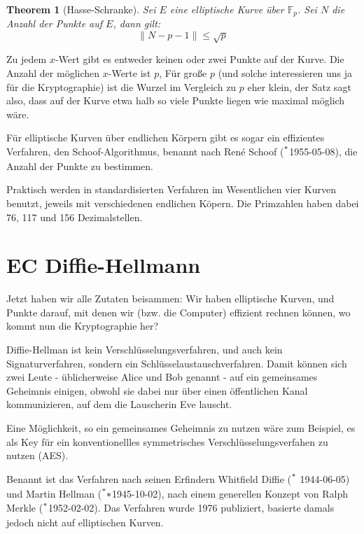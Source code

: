 \documentclass{article}
\newcommand{\F}{\mathbb{F}}
\newcounter{thm}
\newtheorem{theorem}[thm]{Theorem}
\begin{document}
\begin{theorem}[Hasse-Schranke]
    Sei $E$ eine elliptische Kurve über $\F_p$. Sei $N$ die Anzahl der Punkte
    auf $E$, dann gilt:
    \begin{equation}
      \| N - p - 1 \| \le \sqrt{p}
    \end{equation}
\end{theorem}

Zu jedem $x$-Wert gibt es entweder keinen oder zwei Punkte auf der Kurve. Die Anzahl
der möglichen $x$-Werte ist $p$, Für große $p$ (und solche interessieren uns
ja für die Kryptographie) ist die Wurzel im Vergleich zu $p$ eher klein,
der Satz sagt also, dass auf der Kurve etwa halb so viele Punkte liegen wie
maximal möglich wäre.

Für elliptische Kurven über endlichen Körpern gibt es sogar ein effizientes
Verfahren, den Schoof-Algorithmus, benannt nach René Schoof ($\strut^*$1955-05-08),
die Anzahl der Punkte zu bestimmen.

Praktisch werden in standardisierten Verfahren im Wesentlichen vier Kurven
benutzt, jeweils mit verschiedenen endlichen Köpern. Die Primzahlen haben
dabei 76, 117 und 156 Dezimalstellen.



\section{EC Diffie-Hellmann}

Jetzt haben wir alle Zutaten beisammen: Wir haben elliptische Kurven, und
Punkte darauf, mit denen wir (bzw. die Computer) effizient rechnen können, wo
kommt nun die Kryptographie her?

Diffie-Hellman ist kein Verschlüsselungsverfahren, und auch kein
Signaturverfahren, sondern ein Schlüsselaustauschverfahren.  Damit können sich
zwei Leute - üblicherweise Alice und Bob genannt - auf ein gemeinsames
Geheimnis einigen, obwohl sie dabei nur über einen öffentlichen Kanal kommunizieren,
auf dem die Lauscherin Eve lauscht.

Eine Möglichkeit, so ein gemeinsames Geheimnis zu nutzen wäre zum
Beispiel, es als Key für ein konventionellles symmetrisches
Verschlüsselungsverfahen zu nutzen (AES).

Benannt ist das Verfahren nach seinen Erfindern Whitfield Diffie
($\strut^*$ 1944-06-05) und Martin
Hellman ($\strut^**$1945-10-02), nach einem generellen Konzept von Ralph
Merkle ($\strut^*$1952-02-02). Das Verfahren wurde 1976 publiziert, basierte
damals jedoch nicht auf elliptischen Kurven.
\end{document}
